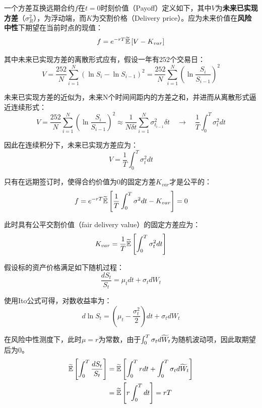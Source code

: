 \documentclass[11pt]{article}
\begin{document}
一个方差互换远期合约$f$在$t=0$时刻价值（Payoff）定义如下，其中$V$为\textbf{未来已实现方差}（$\sigma_R^2$），为浮动端，而$K$为交割价格（Delivery price）。应为未来价值在\textbf{风险中性}下期望在当前时点的现值：
\begin{equation*}
    f = e^{-rT} \widetilde{\mathbb{E}} \left[V - K_{var} \right]
\end{equation*}

其中未来已实现方差的离散形式应有，假设一年有252个交易日：
\begin{equation*}
    V = \frac{252}{N} \sum^{N}_{i=1}\left(\ln S_i - \ln S_{i-1} \right)^2
    = \frac{252}{N} \sum^{N}_{i=1}\left(\ln \frac{S_i}{S_{i-1}} \right)^2
\end{equation*}

未来已实现方差的近似为，未来N个时间间距内的方差之和，并进而从离散形式逼近连续形式：
\begin{equation*}
    V = \frac{252}{N} \sum^{N}_{i=1}\left(\ln \frac{S_i}{S_{i-1}} \right)^2
    \approx \frac{1}{N\delta t} \sum^{N}_{i=1} \sigma^{2}_{t_{i-1}}\delta t
    \quad\rightarrow\quad \frac{1}{T} \int^T_0 \sigma^2_t dt
\end{equation*}

因此在连续积分下，未来已实现方差应为：
\begin{equation*}
    V = \frac{1}{T} \int^T_0 \sigma^2_t dt
\end{equation*}

只有在远期签订时，使得合约价值为0的固定方差$K_{var}$才是公平的：
\begin{equation*}
    f = e^{-rT} \widetilde{\mathbb{E}} \left[ \frac{1}{T} \int^T_0 \sigma^2 dt - K_{var} \right] = 0
\end{equation*}

此时具有公平交割价值（fair delivery value）的固定方差应为：
\begin{equation*}
    K_{var} = \frac{1}{T} \widetilde{\mathbb{E}} \left[ \int^T_0 \sigma^2_t dt \right]
\end{equation*}

假设标的资产价格满足如下随机过程：
\begin{equation*}
    \frac{dS_t}{S_t} = \mu_t dt + \sigma_t dW_t
\end{equation*}

使用Ito公式可得，对数收益率为：
\begin{equation*}
    d \ln S_t = \left(\mu_t - \frac{\sigma^2_t}{2} \right) dt + \sigma_t dW_t
\end{equation*}

在风险中性测度下，此时$\mu=r$为常数，由于$\int^T_0 \sigma_t d\widetilde{W}_t$为随机波动项，因此取期望后为0。
\begin{align*}
    \widetilde{\mathbb{E}} \left[ \int_0^T \frac{dS_t}{S_t} \right] 
    &= \widetilde{\mathbb{E}} \left[ \int^T_0 r dt + \int^T_0 \sigma_t d\widetilde{W}_t \right] \\
    &= \widetilde{\mathbb{E}} \left[ r \int^T_0 dt \right] = rT
\end{align*}
\end{document}
